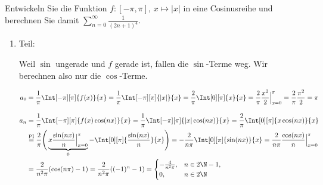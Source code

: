 
\begin{exercise}

Entwickeln Sie die Funktion $f: [-\pi, \pi]$, $x \mapsto |x|$ in eine Cosinusreihe und berechnen Sie damit $\sum_{n=0}^\infty \frac{1}{(2 n + 1)^4}$.

\end{exercise}


\begin{solution}

\phantom{}

\begin{enumerate}[label = \arabic*.]

    \item Teil:

    Weil $\sin$ ungerade und $f$ gerade ist, fallen die $\sin$-Terme weg.
    Wir berechnen also nur die $\cos$-Terme.

    \begin{align*}
        a_0
        =
        \frac{1}{\pi}
        \Int[-\pi][\pi]
        {
            f(x)
        }{x}
        =
        \frac{1}{\pi}
        \Int[-\pi][\pi]
        {
            |x|
        }{x}
        =
        \frac{2}{\pi}
        \Int[0][\pi]{x}{x}
        =
        \frac{2}{\pi}
        \frac{x^2}{2} \Big |_{x=0}^\pi
        =
        \frac{2}{\pi}
        \frac{\pi^2}{2}
        =
        \pi
    \end{align*}

    \begin{align*}
        a_n
        & =
        \frac{1}{\pi}
        \Int[-\pi][\pi]
        {
            f(x) \cos(n x)
        }{x}
        =
        \frac{1}{\pi}
        \Int[-\pi][\pi]
        {
            |x| \cos(n x)
        }{x}
        =
        \frac{2}{\pi}
        \Int[0][\pi]
        {
            x \cos(n x)
        }{x} \\
        & \stackrel
        {
            \mathrm{PI}
        }{=}
        \frac{2}{\pi}
        \Bigg (
            \underbrace
            {
                x \frac{\sin(n x)}{n} \Big |_{x=0}^\pi
            }_0
            -
            \Int[0][\pi]
            {
                \frac{\sin(n x)}{n}
            }{x}
        \Bigg )
        =
        -\frac{2}{n \pi}
        \Int[0][\pi]
        {
            \sin(n x)
        }{x}
        =
        \frac{2}{n \pi}
        \frac{\cos(n x)}{n} \Big |_{x=0}^\pi \\
        & =
        \frac{2}{n^2 \pi}
        (
            \cos(n \pi) - 1
        )
        =
        \frac{2}{n^2 \pi}
        ((-1)^n - 1)
        =
        \begin{cases}
            -\frac{4}{n^2 \pi}, & n \in 2 \N - 1, \\
            0,                  & n \in 2 \N
        \end{cases}
    \end{align*}


\end{enumerate}
\end{solution}
